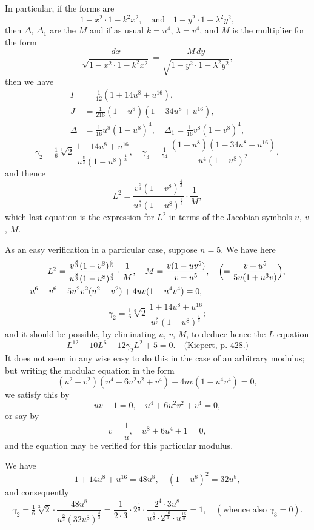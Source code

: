 \documentclass[11pt,a4paper]{article}
\theoremstyle{definition}
\begin{document}
In particular, if the forms are
\[1 - x^2 \cdot 1 - k^2x^2, \quad \text{and} \quad 1 - y^2 \cdot 1 - \lambda^2 y^2,\]
then $\Delta$, $\Delta_1$ are the $M$ and if as usual $k = u^4$, $\lambda = v^4$, and $M$ is the multiplier for the form
\[
\frac{dx}{\sqrt{1 - x^2 \cdot 1 - k^2x^2}} = \frac{M\,dy}{\sqrt{1 - y^2 \cdot 1 - \lambda^2y^2}},
\]
then we have
\begin{align*}
I &= \tfrac{1}{12}(1 + 14u^8 + u^{16}), \\
J &= \tfrac{1}{216}(1 + u^8)(1 - 34u^8 + u^{16}), \\
\Delta &= \tfrac{1}{16}u^8(1 - u^8)^4, \quad \Delta_1 = \tfrac{1}{16}v^8(1 - v^8)^4,
\end{align*}
\[
\gamma_2 = \tfrac{1}{6}\sqrt[3]{2}\, \frac{1 + 14u^8 + u^{16}}{u^{\frac{8}{3}}(1 - u^8)^{\frac{4}{3}}}, \quad
\gamma_3 = \tfrac{1}{54}\, \frac{(1 + u^8)(1 - 34u^8 + u^{16})}{u^4(1 - u^8)^2},
\]
and thence
\[L^2 = \frac{v^{\frac{8}{3}}(1 - v^8)^{\frac{4}{3}}}{u^{\frac{8}{3}}(1 - u^8)^{\frac{4}{3}}} \cdot \frac{1}{M},\]
which last equation is the expression for $L^2$ in terms of the Jacobian symbols $u$, $v$, $M$.

As an easy verification in a particular case, suppose $n = 5$. We have here
\begin{align*}
L^2 &= \frac{v^{\frac{8}{3}}(1 - v^8)^{\frac{4}{3}}}{u^{\frac{8}{3}}(1 - u^8)^{\frac{4}{3}}} \cdot \frac{1}{M}, \quad
M = \frac{v(1 - uv^5)}{v - u^5}, \quad \Bigl(= \frac{v + u^5}{5u(1 + u^3v)}\Bigr), \\
u^6 - v^6 &+ 5u^2v^2(u^2 - v^2) + 4uv(1 - u^4v^4) = 0,
\end{align*}
\[\gamma_2 = \tfrac{1}{6}\sqrt[3]{2}\, \frac{1 + 14u^8 + u^{16}}{u^{\frac{8}{3}}(1 - u^8)^{\frac{4}{3}}};\]
and it should be possible, by eliminating $u$, $v$, $M$, to deduce hence the $L$-equation
\[L^{12} + 10L^6 - 12\gamma_2 L^2 + 5 = 0. \quad \text{(Kiepert, p.~428.)}\]
It does not seem in any wise easy to do this in the case of an arbitrary modulus; but writing the modular equation in the form
\[(u^2 - v^2)(u^4 + 6u^2v^2 + v^4) + 4uv(1 - u^4v^4) = 0,\]
we satisfy this by
\[uv - 1 = 0, \quad u^4 + 6u^2v^2 + v^4 = 0,\]
or say by
\[v = \frac{1}{u}, \quad u^8 + 6u^4 + 1 = 0,\]
and the equation may be verified for this particular modulus.

We have
\[1 + 14u^8 + u^{16} = 48u^8, \quad (1 - u^8)^2 = 32u^8,\]
and consequently
\[\gamma_2 = \tfrac{1}{6}\sqrt[3]{2} \cdot \frac{48u^8}{u^{\frac{8}{3}}(32u^8)^{\frac{4}{3}}} = \frac{1}{2 \cdot 3} \cdot 2^{\frac{1}{3}} \cdot \frac{2^4 \cdot 3u^8}{u^{\frac{8}{3}} \cdot 2^{\frac{10}{3}} \cdot u^{\frac{16}{3}}} = 1, \quad (\text{whence also } \gamma_3 = 0).\]
\end{document}
